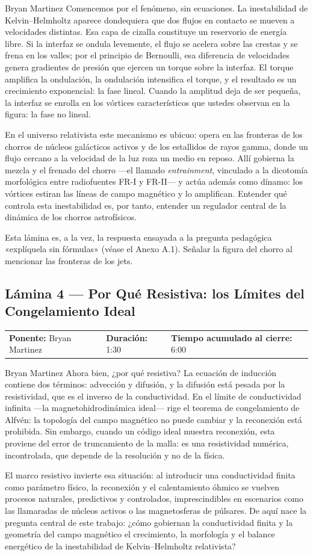 \documentclass[11pt,letterpaper]{article}
\makeatletter
\newcommand{\lamina}[5]{%
  \subsection*{Lámina #1 --- #2}
  \noindent
  \begin{tabular}{@{}llll@{}}
    \textbf{Ponente:} #3 &\quad \textbf{Duración:} #4 &\quad
    \textbf{Tiempo acumulado al cierre:} #5 &
  \end{tabular}
  \vspace{2pt}}
\makeatother
\begin{document}
\begin{parlamento}{Bryan Martinez}
Comencemos por el fenómeno, sin ecuaciones. La inestabilidad de
Kelvin--Helmholtz aparece dondequiera que dos flujos en contacto se mueven a
velocidades distintas. Esa capa de cizalla constituye un reservorio de
energía libre. Si la interfaz se ondula levemente, el flujo se acelera sobre
las crestas y se frena en los valles; por el principio de Bernoulli, esa
diferencia de velocidades genera gradientes de presión que ejercen un torque
sobre la interfaz. El torque amplifica la ondulación, la ondulación
intensifica el torque, y el resultado es un crecimiento exponencial: la fase
lineal. Cuando la amplitud deja de ser pequeña, la interfaz se enrolla en los
vórtices característicos que ustedes observan en la figura: la fase no
lineal.

En el universo relativista este mecanismo es ubicuo: opera en las fronteras
de los chorros de núcleos galácticos activos y de los estallidos de rayos
gamma, donde un flujo cercano a la velocidad de la luz roza un medio en
reposo. Allí gobierna la mezcla y el frenado del chorro ---el llamado
\emph{entrainment}, vinculado a la dicotomía morfológica entre radiofuentes
FR-I y FR-II--- y actúa además como dínamo: los vórtices estiran las líneas
de campo magnético y lo amplifican. Entender qué controla esta inestabilidad
es, por tanto, entender un regulador central de la dinámica de los chorros
astrofísicos.
\end{parlamento}

\begin{indicaciones}
Esta lámina es, a la vez, la respuesta ensayada a la pregunta pedagógica
«explíquela sin fórmulas» (véase el Anexo A.1). Señalar la figura del chorro
al mencionar las fronteras de los jets.
\end{indicaciones}

\lamina{4}{Por Qué Resistiva: los Límites del Congelamiento Ideal}{Bryan Martinez}{1:30}{6:00}

\begin{parlamento}{Bryan Martinez}
Ahora bien, ¿por qué resistiva? La ecuación de inducción contiene dos
términos: advección y difusión, y la difusión está pesada por la
resistividad, que es el inverso de la conductividad. En el límite de
conductividad infinita ---la magnetohidrodinámica ideal--- rige el teorema de
congelamiento de Alfvén: la topología del campo magnético no puede cambiar y
la reconexión está prohibida. Sin embargo, cuando un código ideal muestra
reconexión, esta proviene del error de truncamiento de la malla: es una
resistividad numérica, incontrolada, que depende de la resolución y no de la
física.

El marco resistivo invierte esa situación: al introducir una conductividad
finita como parámetro físico, la reconexión y el calentamiento óhmico se
vuelven procesos naturales, predictivos y controlados, imprescindibles en
escenarios como las llamaradas de núcleos activos o las magnetosferas de
púlsares. De aquí nace la pregunta central de este trabajo: ¿cómo gobiernan
la conductividad finita y la geometría del campo magnético el crecimiento, la
morfología y el balance energético de la inestabilidad de Kelvin--Helmholtz
relativista?
\end{parlamento}
\end{document}
